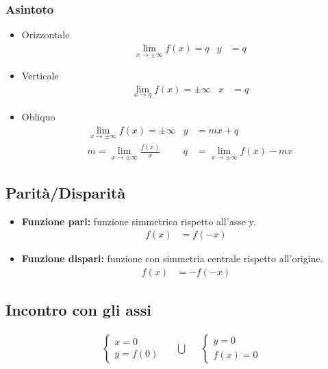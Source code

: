 \documentclass[a4paper]{article}
\begin{document}
		\subsubsection*{Asintoto}
		\begin{itemize}
			\item Orizzontale\\
			\begin{align*}
				&\lim\limits_{x \to \pm \infty}{f(x)} = q	&	y&=q
			\end{align*}
			
			\item Verticale\\
			\begin{align*}
				&\lim\limits_{x \to q}{f(x)} = \pm \infty	&	x&=q
			\end{align*}
			\item Obliquo\\
			\begin{align*}
			&\lim\limits_{x \to \pm \infty}{f(x)} = \pm \infty	&	y&=mx+q\\
			&m=\lim\limits_{x \to \pm \infty}{\frac{f(x)}{x}}   &	q&=\lim\limits_{x \to \pm \infty}{f(x)-mx}
			\end{align*}
						
		\end{itemize}
		
		\subsection{Parità/Disparità}
		\begin{itemize}
			\item \textbf{Funzione pari:} funzione simmetrica rispetto all'asse y.
			\begin{align*}
				f(x) &= f(-x)
			\end{align*}
			\item \textbf{Funzione dispari:} funzione con simmetria centrale rispetto all'origine.
			\begin{align*}
				f(x) &= -f(-x)
			\end{align*}
		\end{itemize}
		
		\subsection{Incontro con gli assi}
		\begin{align*}
			&\begin{cases}
			x = 0\\
			y = f(0)
			\end{cases}	&	&\bigcup &	&\begin{cases}
			y = 0\\
			f(x) = 0
			\end{cases}
		\end{align*}
		
\end{document}
